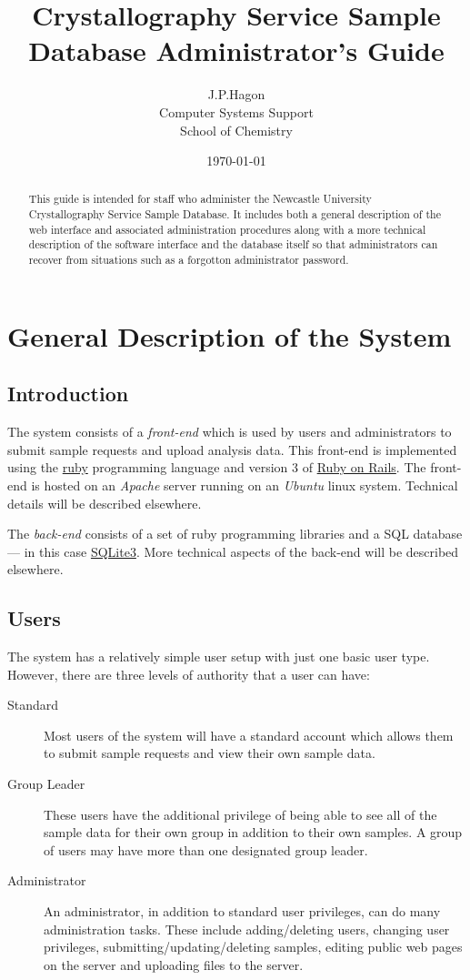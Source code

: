 \documentclass[12pt]{article}
\title{\sffamily\bfseries Crystallography Service Sample Database Administrator's Guide}
\author{J.P.Hagon\\Computer Systems Support\\School of Chemistry}
\date{\today}
\begin{document}
\maketitle
\begin{abstract}
This guide is intended for staff who administer the Newcastle University
Crystallography Service Sample Database.
It includes both a general description of the web interface and 
associated administration procedures along with a more technical
description of the software interface and the database itself so that
administrators can recover from situations such as a forgotton
administrator password.
\end{abstract}
\tableofcontents
\newpage
\section{General Description of the System}
\subsection{Introduction}
The system consists of a \emph{front-end} which is used by users
and administrators to submit sample requests and upload analysis data. 
This front-end is implemented using the 
\href{http://www.ruby-lang.org/en/}{ruby} programming language and 
version 3 of \href{http://rubyonrails.org}{Ruby on Rails}.
The front-end is hosted on an \emph{Apache} server running on an
\emph{Ubuntu} linux system. Technical details will be described elsewhere.

The \emph{back-end} consists of a set of ruby programming libraries
and a SQL database --- in this case 
\href{http://www.sqlite.org/}{SQLite3}.
More technical aspects of the back-end will be described elsewhere.

\subsection{Users}

The system has a relatively simple user setup with just one basic user
type. However, there are three levels of authority that a user can have:
\begin{description}
\item[Standard]
Most users of the system will have a standard account which allows them
to submit sample requests and view their own sample data.
\item[Group Leader]
These users have the additional privilege of being able to see all
of the sample data for their own group in addition to their own
samples. A group of users may have more than one designated group leader.
\item[Administrator]
An administrator, in addition to standard user privileges, can do many
administration tasks. These include adding/deleting users, changing user
privileges, submitting/updating/deleting samples, editing public web
pages on the server and uploading files to the server.
\end{description}
\end{document}
